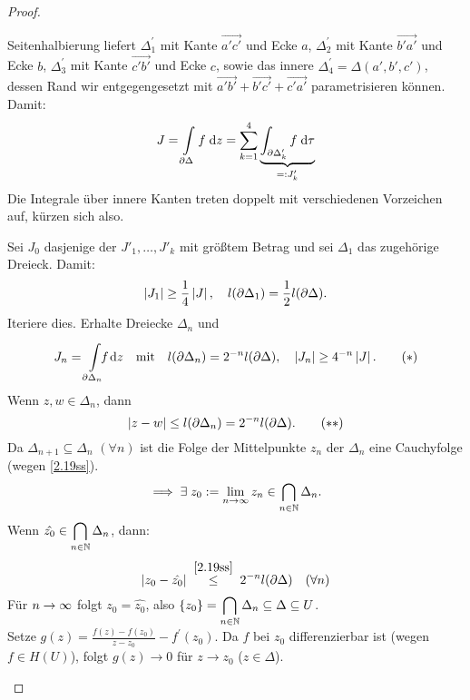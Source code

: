 \documentclass[a4paper,twoside,DIV15,BCOR12mm]{scrbook}
\begin{document}
\begin{proof}
\begin{enumerate}[label=(\arabic*),ref=(\arabic*)]
\begin{center}
\begin{tikzpicture}[scale=3]
\end{tikzpicture}
\end{center}

Seitenhalbierung liefert $\Delta_1^\prime$ mit Kante $\overrightarrow{a' c'}$ und Ecke $a$, $\Delta_2^\prime$ mit Kante $\overrightarrow{b' a'}$ und Ecke $b$, $\Delta_3^\prime$ mit Kante $\overrightarrow{c' b'}$ und Ecke $c$, sowie das innere $\Delta_4^\prime = \Delta(a',b',c')$, dessen Rand wir entgegengesetzt mit $\overrightarrow{a'b'} + \overrightarrow{b'c'}+\overrightarrow{c' a'}$ parametrisieren können. Damit:
\[J=\Integral{\partial\Delta}{}{f}{z} = \sum_{k=1}^4\underbrace{\integral{\partial\Delta'_k}{}{f}{\tau}}_{\ad J'_k}\]
Die Integrale über innere Kanten treten doppelt mit verschiedenen Vorzeichen auf, kürzen sich also.

Sei $J_0$ dasjenige der $J'_1,\dotsc,J'_k$ mit größtem Betrag und sei $\Delta_1$ das zugehörige Dreieck. Damit:
\[\abs{J_1}\geq\frac{1}{4}\abs{J},\quad l(\partial\Delta_1)=\frac{1}{2}l(\partial\Delta).\]
Iteriere dies. Erhalte Dreiecke $\Delta_n$ und
\[\label{2.19s}J_n = \Integral{\partial\Delta_n}{}{\!\!\!f\!}{z}\quad\text{mit}\quad l(\partial\Delta_n)=2^{-n}l(\partial\Delta),\quad\abs{J_n}\geq 4^{-n}\abs{J}.\tag{$*$}\]
Wenn $z,w\in\Delta_n$, dann
\[\label{2.19ss}\abs{z-w}\leq l(\partial\Delta_n) = 2^{-n}l(\partial\Delta).\tag{$**$}\]
Da $\Delta_{n+1}\subseteq \Delta_n$ $(\forall n)$ ist die Folge der Mittelpunkte $z_n$ der $\Delta_n$ eine Cauchyfolge (wegen \eqref{2.19ss}).
\[\folgt\exists\; z_0\da \lim_{n\ra\infty}z_n\in\bigcap_{\nat{n}}\Delta_n.\]
Wenn $\displaystyle \hat{z_0}\in\bigcap_{\nat{n}}\Delta_n$, dann:
\[\abs{z_0-\hat{z_0}}\wegen{\leq}{\eqref{2.19ss}}2^{-n}l(\partial\Delta)\quad(\forall n)\]
Für $n\ra\infty$ folgt $z_0 = \hat{z_0}$, also $\displaystyle\{z_0\}=\bigcap_{\nat{n}}\Delta_n\subseteq\Delta\subseteq U$.\\
Setze $\displaystyle g(z)=\frac{f(z)-f(z_0)}{z-z_0}-f^\prime(z_0)$. Da $f$ bei $z_0$ differenzierbar ist (wegen $f\in H(U)$),
folgt $g(z)\to0$ für $z\to z_0$ ($z\in\Delta$).


\end{enumerate}
\end{proof}
\end{document}
